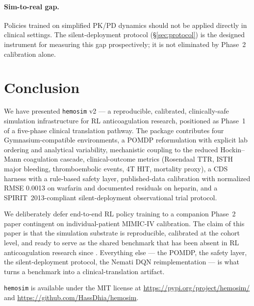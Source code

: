 \documentclass[11pt]{article}
\begin{document}
\paragraph{Sim-to-real gap.} Policies trained on simplified PK/PD dynamics should not be applied directly in clinical settings. The silent-deployment protocol (\S\ref{sec:protocol}) is the designed instrument for measuring this gap prospectively; it is not eliminated by Phase~2 calibration alone.

\section{Conclusion}
\label{sec:conclusion}

We have presented \texttt{hemosim} v2 --- a reproducible, calibrated, clinically-safe simulation infrastructure for RL anticoagulation research, positioned as Phase~1 of a five-phase clinical translation pathway. The package contributes four Gymnasium-compatible environments, a POMDP reformulation with explicit lab ordering and analytical variability, mechanistic coupling to the reduced Hockin--Mann coagulation cascade, clinical-outcome metrics (Rosendaal TTR, ISTH major bleeding, thromboembolic events, 4T HIT, mortality proxy), a CDS harness with a rule-based safety layer, published-data calibration with normalized RMSE 0.0013 on warfarin and documented residuals on heparin, and a SPIRIT~2013-compliant silent-deployment observational trial protocol.

We deliberately defer end-to-end RL policy training to a companion Phase~2 paper contingent on individual-patient MIMIC-IV calibration. The claim of this paper is that the simulation substrate is reproducible, calibrated at the cohort level, and ready to serve as the shared benchmark that has been absent in RL anticoagulation research since \citet{nemati2016}. Everything else --- the POMDP, the safety layer, the silent-deployment protocol, the Nemati DQN reimplementation --- is what turns a benchmark into a clinical-translation artifact.

\texttt{hemosim} is available under the MIT license at \url{https://pypi.org/project/hemosim/} and \url{https://github.com/HassDhia/hemosim}.

\end{document}
